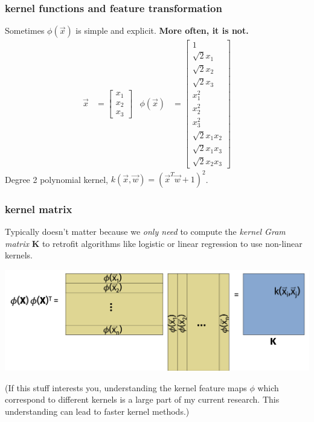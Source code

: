 \documentclass[handout,compress]{beamer}
\newcommand{\bv}[1]{\mathbf{#1}}
\begin{document}
\begin{frame} 
	\frametitle{kernel functions and feature transformation}
	\small
	\begin{center}
		Sometimes $\phi(\vec{x})$ is simple and explicit. \textbf{More often, it is not.}
	\begin{align*}
	\vec{x} &= \begin{bmatrix}x_1\\x_2\\x_3\end{bmatrix} & \phi(\vec{x}) &= \begin{bmatrix}1\\ \sqrt{2}x_1\\\sqrt{2}x_2\\\sqrt{2}x_3 \\ x_1^2 \\ x_2^2 \\ x_3^2 \\ \sqrt{2}x_1x_2 \\ \sqrt{2}x_1x_3 \\ \sqrt{2}x_2x_3\end{bmatrix}  
	\end{align*}
	Degree 2 polynomial kernel, $k(\vec{x},\vec{w}) = (\vec{x}^T\vec{w} + 1)^2$.
	\end{center}
\end{frame}

\begin{frame} 
	\frametitle{kernel matrix}
	Typically doesn't matter because we \emph{only need} to compute the \emph{kernel Gram matrix} $\bv{K}$ to retrofit algorithms like logistic or linear regression to use non-linear kernels. 
	\begin{center}
		\includegraphics[width=\textwidth]{kernel_matrix.png}
	\end{center}
	\footnotesize{(If this stuff interests you, understanding the kernel feature maps $\phi$ which correspond to different kernels is a large part of my current research. This understanding can lead to faster kernel methods.)}
\end{frame}
\end{document}
